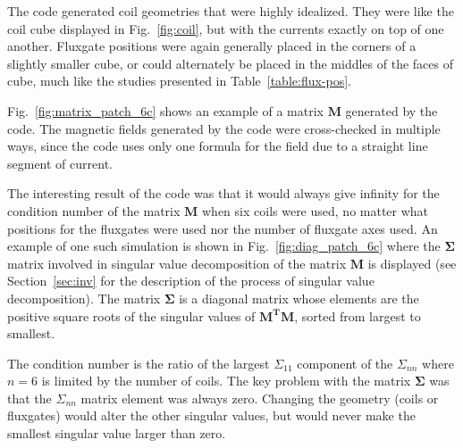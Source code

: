 The code generated coil geometries that were highly idealized.  They
were like the coil cube displayed in Fig.~\ref{fig:coil}, but with the
currents exactly on top of one another.  Fluxgate positions were again
generally placed in the corners of a slightly smaller cube, or could
alternately be placed in the middles of the faces of cube, much like
the studies presented in Table~\ref{table:flux-pos}.


Fig.~\ref{fig:matrix_patch_6c} shows an example of a matrix $\bm{M}$
generated by the code.  The magnetic fields generated by the code were
cross-checked in multiple ways, since the code uses only one formula
for the field due to a straight line segment of current.

The interesting result of the code was that it would always give
infinity for the condition number of the matrix $\bm{M}$ when six
coils were used, no matter what positions for the fluxgates were used
nor the number of fluxgate axes used. An example of one such
simulation is shown in Fig.~\ref{fig:diag_patch_6c} where the
$\bm{\Sigma}$ matrix involved in singular value decomposition of the
matrix $\bm{M}$ is displayed (see Section~\ref{sec:inv} for the
description of the process of singular value decomposition).  The
matrix $\bm{\Sigma}$ is a diagonal matrix whose elements are the
positive square roots of the singular values of $\bm{M^T}\bm{M}$,
sorted from largest to smallest.


The condition number is the ratio of the largest $\Sigma_{11}$
component of the $\Sigma_{nn}$ where $n=6$ is limited by the number of
coils. The key problem with the matrix $\bm{\Sigma}$ was that the
$\Sigma_{nn}$ matrix element was always zero.  Changing the geometry
(coils or fluxgates) would alter the other singular values, but would
never make the smallest singular value larger than zero.


